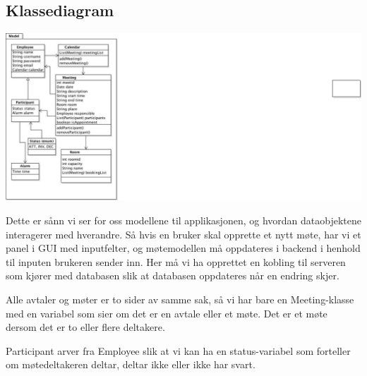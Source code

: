 
\subsection{Klassediagram}

\begin{centering}
\includegraphics[scale=0.75]{klassediagram.jpg}
\end{centering}

Dette er sånn vi ser for oss modellene til applikasjonen, og hvordan dataobjektene interagerer med hverandre. Så hvis en bruker skal opprette et nytt møte, har vi et panel i GUI med inputfelter, og møtemodellen må oppdateres i backend i henhold til inputen brukeren sender inn. Her må vi ha opprettet en kobling til serveren som kjører med databasen slik at databasen oppdateres når en endring skjer. 

Alle avtaler og møter er to sider av samme sak, så vi har bare en Meeting-klasse med en variabel som sier om det er en avtale eller et møte. Det er et møte dersom det er to eller flere deltakere. 

Participant arver fra Employee slik at vi kan ha en status-variabel som forteller om møtedeltakeren deltar, deltar ikke eller ikke har svart. 

